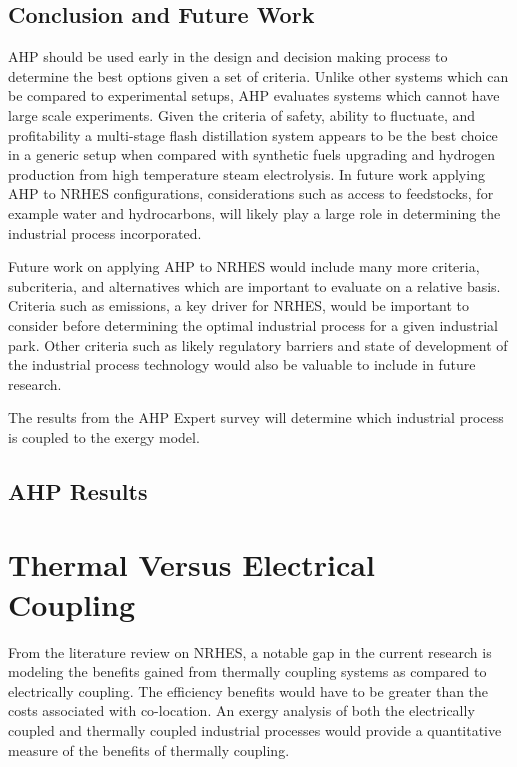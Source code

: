 \documentclass[12pt]{UIdahoMastersThesis}
\begin{document}
\newpage
\section{Conclusion and Future Work}

AHP should be used early in the design and decision making process to determine the best options given a set of criteria. Unlike other systems which can be compared to experimental setups, AHP evaluates systems which cannot have large scale experiments. Given the criteria of safety, ability to fluctuate, and profitability a multi-stage flash distillation system appears to be the best choice in a generic setup when compared with synthetic fuels upgrading and hydrogen production from high temperature steam electrolysis. In future work applying AHP to NRHES configurations, considerations such as access to feedstocks, for example water and hydrocarbons, will likely play a large role in determining the industrial process incorporated.

 Future work on applying AHP to NRHES would include many more criteria, subcriteria, and alternatives which are important to evaluate on a relative basis.  Criteria such as emissions, a key driver for NRHES, would be important to consider before determining the optimal industrial process for a given industrial park. Other criteria such as likely regulatory barriers and state of development of the industrial process technology would also be valuable to include in future research.

The results from the AHP Expert survey will determine which industrial process is coupled to the exergy model.
\section{AHP Results}

\chapter{Thermal Versus Electrical Coupling}
From the literature review on NRHES, a notable gap in the current research is modeling the benefits gained from thermally coupling systems as compared to electrically coupling.  The efficiency benefits would have to be greater than the costs associated with co-location.  An exergy analysis of both the electrically coupled and thermally coupled industrial processes would provide a quantitative measure of the benefits of thermally coupling.
\end{document}

